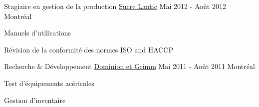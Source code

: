 \begin{cventries}
  \cventry
    {Stagiaire en gestion de la production} %
    {\href{https://www.lanticrogers.com/}{Sucre Lantic}} %
    {Mai 2012 - Août 2012} %
    {Montréal} %
    {
      \begin{cvitems} %
        \item {Manuels d'utilisations}
        \item {Révision de la conformité des normes ISO and HACCP}
      \end{cvitems}
    }

\end{cventries}

\newpage
{}


\begin{cventries}

  \cventry
  {Recherche \& Développement} %
  {\href{https://www.dominiongrimm.ca/en/home.html}{Dominion et Grimm}} %
    {Mai 2011 - Août 2011} %
    {Montréal} %
    {
      \begin{cvitems} %
        \item {Test d'équipements acéricoles}
        \item {Gestion d'inventaire}
      \end{cvitems}
    }

\end{cventries}

